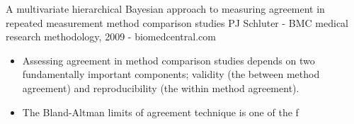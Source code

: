 A multivariate hierarchical Bayesian approach to measuring agreement in repeated measurement method comparison studies
PJ Schluter - BMC medical research methodology, 2009 - biomedcentral.com

\begin{itemize}
\item Assessing agreement in method comparison studies depends on two fundamentally important 
components; validity (the between method agreement) and reproducibility (the within method 
agreement). 
\item The Bland-Altman limits of agreement technique is one of the f
\end{itemize}

